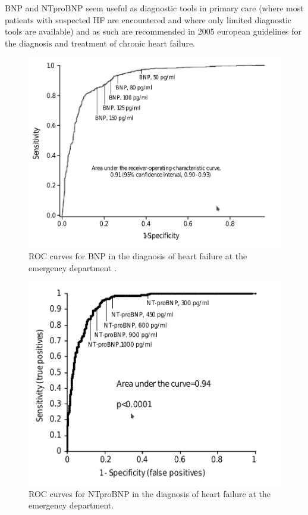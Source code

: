 \documentclass[14pt,a4paper,onecolumn]{extarticle}
\begin{document}
BNP and NTproBNP seem useful as diagnostic tools in primary care (where most patients with suspected HF are encountered and where only limited diagnostic tools are available) and as such are recommended in 2005 european guidelines for the diagnosis and treatment of chronic heart failure. \citep{Swedberg2005}

\begin{figure}      \centering      \includegraphics[scale=0.4]{../../images/BNP_ER.png}      \small\caption{ROC curves for BNP in the diagnosis of heart failure at the emergency department \citep{Januzzi2005}.}      \label{BNP_ER}  \end{figure}

\begin{figure}     \centering     \includegraphics[scale=0.4]{../../images/NTBNP_ER.png}     \small\caption{ROC curves for NTproBNP in the diagnosis of heart failure at the emergency department.\citep{Januzzi2005}}     \label{NTBNP_ER} \end{figure}
\end{document}
